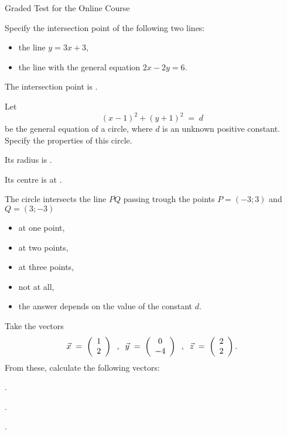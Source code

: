 \begin{MTest}{Graded Test for the Online Course}
\begin{MExercise}
Specify the intersection point of the following two lines:
\begin{itemize}
\item{the line $y=3x+3$,}
\item{the line with the general equation $2x-2y=6$.}
\end{itemize}

The intersection point is .\\
\end{MExercise}


\begin{MExercise}
Let
$$
(x-1)^2+(y+1)^2 \;=\; d
$$
be the general equation of a circle, where $d$ is an unknown positive constant. 
Specify the properties of this circle.
\begin{MExerciseItems}
\item{Its radius is .}
\item{Its centre is at .}
\item{The circle intersects the line $\overline{P Q}$ passing trough the points $P=(-3;3)$ and $Q=(3;-3)$\\
\begin{itemize}
\item{ at one point,}
\item{ at two points,}
\item{ at three points,}
\item{ not at all,}
\item{ the answer depends on the value of the constant $d$.}
\end{itemize}
}
\end{MExerciseItems}
\end{MExercise}


\begin{MExercise}
Take the vectors
$$
\vec{x} \;=\; \left({\begin{array}{c}1\\2\end{array}}\right)\;\; , \;\;
\vec{y} \;=\; \left({\begin{array}{c}0\\-4\end{array}}\right)\;\; , \;\;
\vec{z} \;=\; \left({\begin{array}{c}2\\2\end{array}}\right).
$$
From these, calculate the following vectors:
\begin{MExerciseItems}
\item{.}
\item{.}
\item{.}
\end{MExerciseItems}
\end{MExercise}



\end{MTest}
